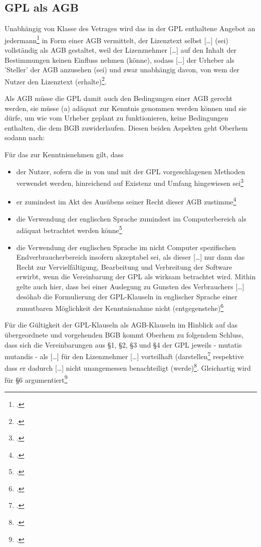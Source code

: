 \documentclass[DIV=calc,BCOR=5mm,11pt,headings=small,oneside,abstract=true, toc=bib]{scrartcl}
\begin{document}
\subsection{\glqq{}GPL als AGB\grqq{}}

Unabhängig von Klasse des Vetrages wird das in der GPL enthaltene
\glqq{}Angebot an jedermann\grqq{}\footcite[vgl.][104]{Oberhem2008a} in Form
einer AGB vermittelt, der Lizenztext selbst \glqq{}[\ldots] (sei)
vollständig als AGB gestaltet\grqq{}, weil \glqq{}der Lizenznehmer
[\ldots] auf den Inhalt der Bestimmungen keinen Einfluss nehmen (könne)\grqq{},
sodass \glqq{}[\ldots] der Urheber als 'Steller' der AGB anzusehen (sei)
und zwar unabhängig davon, von wem der Nutzer den Lizenztext
(erhalte)\grqq{}\footcite[vgl.][133]{Oberhem2008a}.

Als AGB müsse die GPL damit auch den Bedingungen einer AGB gerecht werden, sie
müsse (a) adäquat zur Kenntnis genommen werden können und sie dürfe, um wie vom
Urheber geplant zu funktionieren, keine Bedingungen enthalten, die dem BGB
zuwiderlaufen. Diesen beiden Aspekten geht Oberhem sodann nach:

Für das zur Kenntnisnehmen gilt, dass
\begin{itemize}
  \item der Nutzer, sofern die in von und mit der GPL vorgeschlagenen Methoden
  verwendet werden, hinreichend auf Existenz und Umfang hingewiesen
  sei\footcite[vgl.][134]{Oberhem2008a}
  \item er zumindest im Akt des Ausübens seiner Recht dieser AGB
  zustimme\footcite[vgl.][135]{Oberhem2008a}
  \item die Verwendung der englischen Sprache zumindest im Computerbereich als
  adäquat betrachtet werden könne\footcite[vgl.][135]{Oberhem2008a}
  \item die Verwendung der englischen Sprache im nicht Computer
  spezifischen Endverbraucherbereich insofern akzeptabel sei, als dieser
  \glqq{}[\ldots] nur dann das Recht zur Vervielfältigung, Bearbeitung
  und Verbreitung der Software erwirbt, wenn die Vereinbarung der GPL als
  wirksam betrachtet wird\grqq{}. Mithin gelte auch hier, dass \glqq{}bei
  einer Auslegung zu Gunsten des Verbrauchers [\ldots] desöhab die
  Formulierung der GPL-Klauseln in englischer Sprache einer zumutbaren
  Möglichkeit der Kenntnisnahme nicht
  (entgegenstehe)\grqq{}\footcite[vgl.][136]{Oberhem2008a}
\end{itemize}

Für die Gültigkeit der GPL-Klauseln als AGB-Klauseln im Hinblick auf das
übergeordnete und vorgehenden BGB kommt Oberhem zu folgendem Schluss, dass
sich die Vereinbarungen aus §1, §2, §3 und §4 der GPL jeweils - mutatis mutandis
- als \glqq{}[\ldots] für den Lizenznehmer [\ldots] vorteilhaft
(darstellen\grqq{}\footcite[vgl.][144]{Oberhem2008a} respektive dass er dadurch
\glqq{}[\ldots] nicht unangemessen benachteiligt
(werde)\grqq{}\footcite[vgl.][145]{Oberhem2008a}. Gleichartig wird für §6
argumentiert\footcite[vgl.][148]{Oberhem2008a}
\end{document}
